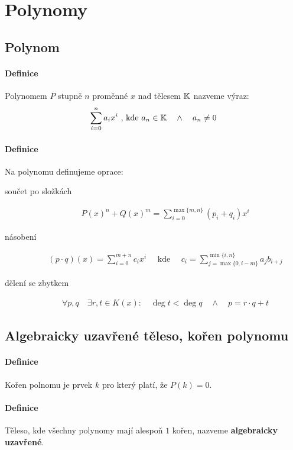 \documentclass[a4paper,10pt]{article}
\begin{document}
\section{Polynomy}
\setcounter{equation}{0}
\subsection{Polynom}
\setcounter{equation}{0}
\paragraph{Definice}
Polynomem $P$ stupně $n$ proměnné $x$ nad tělesem $\mathbb{K}$ nazveme výraz:
\begin{align*}
	\sum_{i=0}^n a_i x^i \text{ , kde } a_n \in \mathbb{K} \quad \land \quad a_n \neq 0
\end{align*}
\paragraph{Definice}
Na polynomu definujeme oprace:
\begin{description}
	\item[součet po složkách]
		\begin{align*}
			P(x)^n + Q(x)^m = \sum_{i=0}^{\max\{m,n\}} (p_i + q_i) x^i
		\end{align*}
	\item[násobení]
		\begin{align*}
			(p \cdot q)(x) = \sum_{i=0}^{m+n} c_i x^i \quad \text{ kde }  \quad
			c_i = \sum_{j=\max\{0, i-m\}}^{\min\{i, n \}} a_j b_{i+j}
		\end{align*}
	\item[dělení se zbytkem]
		\begin{align*}
			\forall p, q \quad \exists r,t \in K(x): \quad \deg t \lt \deg q \quad 
			\land \quad p = r \cdot q + t
		\end{align*}
\end{description}

\subsection{Algebraicky uzavřené těleso, kořen polynomu}
\setcounter{equation}{0}
\paragraph{Definice}
Kořen polnomu je prvek $k$ pro který platí, že $P(k) = 0$.
\paragraph{Definice}
Těleso, kde všechny polynomy mají alespoň $1$ kořen, nazveme \textbf{algebraicky
uzavřené}.
\end{document}
